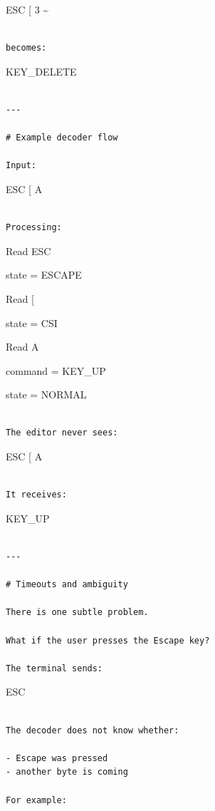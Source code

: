 \documentclass[
  oneside,
  openany]{book}
\begin{document}
ESC {[} 3 \textasciitilde{}

\begin{verbatim}

becomes:
\end{verbatim}

KEY\_DELETE

\begin{verbatim}

---

# Example decoder flow

Input:
\end{verbatim}

ESC {[} A

\begin{verbatim}

Processing:
\end{verbatim}

Read ESC

state = ESCAPE

Read {[}

state = CSI

Read A

command = KEY\_UP

state = NORMAL

\begin{verbatim}

The editor never sees:
\end{verbatim}

ESC {[} A

\begin{verbatim}

It receives:
\end{verbatim}

KEY\_UP

\begin{verbatim}

---

# Timeouts and ambiguity

There is one subtle problem.

What if the user presses the Escape key?

The terminal sends:
\end{verbatim}

ESC

\begin{verbatim}

The decoder does not know whether:

- Escape was pressed
- another byte is coming

For example:
\end{verbatim}
\end{document}
